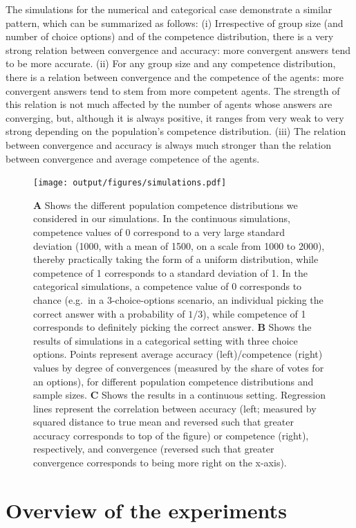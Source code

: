 \documentclass[
  doc,floatsintext]{apa6}
\begin{document}
The simulations for the numerical and categorical case demonstrate a similar pattern, which can be summarized as follows: (i) Irrespective of group size (and number of choice options) and of the competence distribution, there is a very strong relation between convergence and accuracy: more convergent answers tend to be more accurate. (ii) For any group size and any competence distribution, there is a relation between convergence and the competence of the agents: more convergent answers tend to stem from more competent agents. The strength of this relation is not much affected by the number of agents whose answers are converging, but, although it is always positive, it ranges from very weak to very strong depending on the population's competence distribution. (iii) The relation between convergence and accuracy is always much stronger than the relation between convergence and average competence of the agents.



\begin{figure}
\centering
\texttt{[image: output/figures/simulations.pdf]}
\caption{\label{fig:simulations}\textbf{A} Shows the different population competence distributions we considered in our simulations. In the continuous simulations, competence values of 0 correspond to a very large standard deviation (1000, with a mean of 1500, on a scale from 1000 to 2000), thereby practically taking the form of a uniform distribution, while competence of 1 corresponds to a standard deviation of 1. In the categorical simulations, a competence value of 0 corresponds to chance (e.g.~in a 3-choice-options scenario, an individual picking the correct answer with a probability of \(1/3\)), while competence of 1 corresponds to definitely picking the correct answer. \textbf{B} Shows the results of simulations in a categorical setting with three choice options. Points represent average accuracy (left)/competence (right) values by degree of convergences (measured by the share of votes for an options), for different population competence distributions and sample sizes. \textbf{C} Shows the results in a continuous setting. Regression lines represent the correlation between accuracy (left; measured by squared distance to true mean and reversed such that greater accuracy corresponds to top of the figure) or competence (right), respectively, and convergence (reversed such that greater convergence corresponds to being more right on the x-axis).}
\end{figure}

\section{Overview of the experiments}\label{overview-of-the-experiments}
\end{document}
